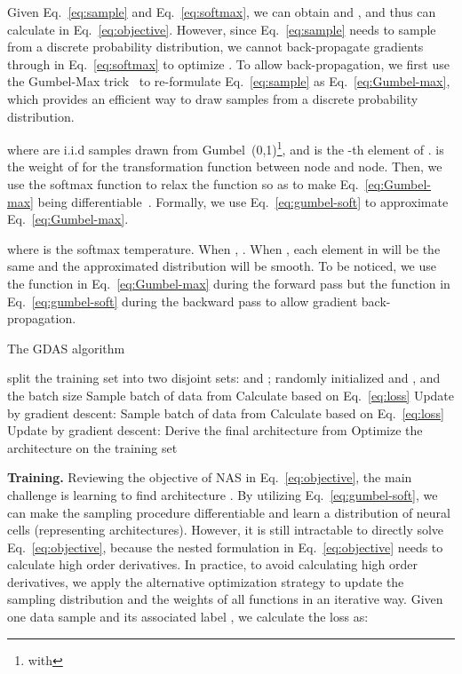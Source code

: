 \documentclass[10pt,twocolumn,letterpaper]{article}
\def\Eqref#1{Eq.~\eqref{#1}}
\begin{document}
Given \Eqref{eq:sample} and \Eqref{eq:softmax}, we can obtain  and , and thus can calculate  in \Eqref{eq:objective}.
However, since \Eqref{eq:sample} needs to sample from a discrete probability distribution, we cannot back-propagate gradients through  in \Eqref{eq:softmax} to optimize .
To allow back-propagation, we first use the Gumbel-Max trick~\cite{gumbel1954statistical,maddison2014sampling} to re-formulate \Eqref{eq:sample} as \Eqref{eq:Gumbel-max}, which provides an efficient way to draw samples from a discrete probability distribution.

\noindent where  are i.i.d samples drawn from Gumbel~(0,1)\footnote{ with }, and
 is the -th element of .
 is the weight of  for the transformation function between node and node.
Then, we use the softmax function to relax the  function so as to make \Eqref{eq:Gumbel-max} being differentiable~\cite{jang2017categorical,maddison2017concrete}.
Formally, we use \Eqref{eq:gumbel-soft} to approximate \Eqref{eq:Gumbel-max}.

\noindent where  is the softmax temperature.
When , .
When , each element in  will be the same and the approximated distribution will be smooth.
To be noticed, we use the  function in \Eqref{eq:Gumbel-max} during the forward pass but the  function in \Eqref{eq:gumbel-soft} during the backward pass to allow gradient back-propagation.



\begin{algorithm}[t]
\small
\caption{The GDAS algorithm}
\label{alg:Train}

  \begin{algorithmic}
\Require split the training set into two disjoint sets:  and ; randomly initialized  and , and the batch size 
     
    	\State Sample batch of data { from }
    	\State Calculate  based on \Eqref{eq:loss}
    	\State Update  by gradient descent: 
    	\State Sample batch of data { from }
    	\State Calculate  based on \Eqref{eq:loss}
    	\State Update  by gradient descent: 
    \EndWhile
    \State Derive the final architecture from 
    \State Optimize the architecture on the training set
  \end{algorithmic}
  
\end{algorithm}



{\bf Training.}
Reviewing the objective of NAS in \Eqref{eq:objective}, the main challenge is learning to find architecture .
By utilizing \Eqref{eq:gumbel-soft}, we can make the sampling procedure differentiable and learn a distribution of neural cells (representing architectures).
However, it is still intractable to directly solve \Eqref{eq:objective}, because the nested formulation in \Eqref{eq:objective} needs to calculate high order derivatives.
In practice, to avoid calculating high order derivatives, we apply the alternative optimization strategy to update the sampling distribution  and the weights of all functions  in an iterative way.
Given one data sample  and its associated label , we calculate the loss as:
\end{document}
